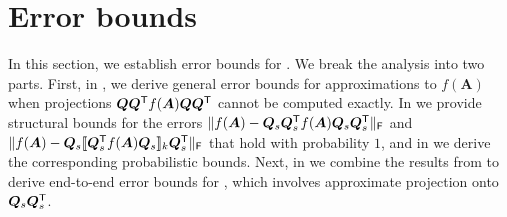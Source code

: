 \section{Error bounds}
In this section, we establish error bounds for . We break the analysis into two parts. First, in , we derive general error bounds for approximations to $f(\bm{A})$ when projections $\bm{Q} \bm{Q}^{\textsf{\textup{T}}} f(\bm{A}) \bm{Q} \bm{Q}^{\textsf{\textup{T}}}$ cannot be computed exactly. In  we provide structural bounds for the errors $\|f(\bm{A})- \bm{Q}_s \bm{Q}_s^{\textsf{\textup{T}}} f(\bm{A}) \bm{Q}_s \bm{Q}_s^{\textsf{\textup{T}}}\|_{\textsf{\textup{F}}}$ and $\|f(\bm{A})- \bm{Q}_s \llbracket \bm{Q}_s^{\textsf{\textup{T}}} f(\bm{A}) \bm{Q}_s\rrbracket_k \bm{Q}_s^{\textsf{\textup{T}}}\|_{\textsf{\textup{F}}}$ that hold with probability $1$, and in  we derive the corresponding probabilistic bounds. Next, in  we combine the results from  to derive end-to-end error bounds for , which involves approximate projection onto $\bm{Q}_s \bm{Q}_s^{\textsf{\textup{T}}}$. %
